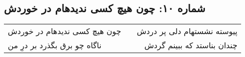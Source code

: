 \begin{center}
\section*{شماره ۱۰: چون هیچ کسی ندیدهام در خوردش}
\label{sec:010}
\begin{longtable}{l p{0.5cm} r}
چون هیچ کسی ندیدهام در خوردش
&&
پیوسته نشستهام دلی پر دردش
\\
ناگاه چو برق بگذرد بر درِ من
&&
چندان بناستد که ببینم گردش
\\
\end{longtable}
\end{center}
